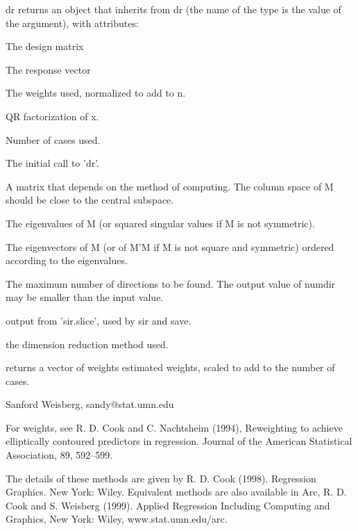 \begin{Value}
dr returns an object that inherits from dr (the name of the type is the
value of the  argument), with attributes:
\begin{ldescription}
\item[\code{x}] The design matrix
\item[\code{y}] The response vector
\item[\code{weights}] The weights used, normalized to add to n.
\item[\code{qr}] QR factorization of x.
\item[\code{cases}] Number of cases used.
\item[\code{call}] The initial call to 'dr'.
\item[\code{M}] A matrix that depends on the method of computing.  The column space
of M should be close to the central subspace.
\item[\code{evalues}] The eigenvalues of M (or squared singular values if M is not
symmetric).
\item[\code{evectors}] The eigenvectors of M (or of M'M if M is not square and
symmetric) ordered according to the eigenvalues.
\item[\code{numdir}] The maximum number of directions to be found.  The output
value of numdir may be smaller than the input value.
\item[\code{slice.info}] output from 'sir.slice', used by sir and save.
\item[\code{method}] the dimension reduction method used.
\end{ldescription}
 

 returns a vector of weights estimated weights, scaled to add to
the number of cases.
\end{Value}
\begin{Author}\relax
Sanford Weisberg, 
sandy@stat.umn.edu 

For weights, see
R. D. Cook and C. Nachtsheim (1994), Reweighting to achieve
elliptically contoured predictors in regression.  Journal of the American
Statistical Association, 89, 592--599.
\end{Author}
\begin{References}\relax
The details of these methods are given by R. D. Cook 
(1998).  Regression Graphics.  New York:  Wiley.  Equivalent 
methods are also available in Arc, R. D. Cook and S. Weisberg 
(1999).  Applied Regression Including Computing and Graphics, New 
York:  Wiley, www.stat.umn.edu/arc.
\end{References}
